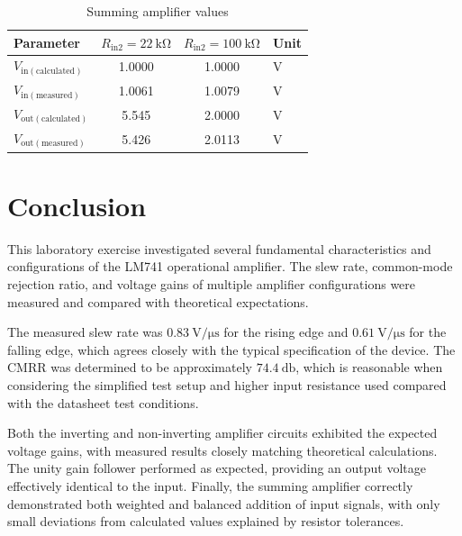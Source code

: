 \documentclass[conference]{IEEEtran}
\newcommand{\Rx}[1]{R_\mathrm{#1}}
\newcommand{\Vx}[1]{V_\mathrm{#1}}
\begin{document}
\begin{table}[!t]
    \centering
    \caption{Summing amplifier values}
    \label{tab:Sum}
    \begin{tabular}{l S[table-format=3.4] S[table-format=3.4] l}
        \toprule
        Parameter & {\(\Rx{in2} = \qty{22}{\kilo\ohm}\)} & {\(\Rx{in2} = \qty{100}{\kilo\ohm}\)} & Unit \\
        \midrule
        \(\Vx{in(calculated)}\)     & 1.0000  & 1.0000       & \(\unit{\volt}\) \\
        \(\Vx{in(measured)}\)       & 1.0061  & 1.0079       & \(\unit{\volt}\) \\
        \(\Vx{out(calculated)}\)    & 5.545   & 2.0000       & \(\unit{\volt}\) \\
        \(\Vx{out(measured)}\)      & 5.426   & 2.0113       & \(\unit{\volt}\) \\
        \bottomrule
    \end{tabular}
\end{table}


\section{Conclusion}

This laboratory exercise investigated several fundamental characteristics and configurations of the LM741 operational amplifier.  
The slew rate, common-mode rejection ratio, and voltage gains of multiple amplifier configurations were measured and compared with theoretical expectations.  

The measured slew rate was \(\qty{0.83}{\volt\per\micro\second}\) for the rising edge and \(\qty{0.61}{\volt\per\micro\second}\) for the falling edge, which agrees closely with the typical specification of the device.  
The CMRR was determined to be approximately \(\qty{74.4}{\decibel}\), which is reasonable when considering the simplified test setup and higher input resistance used compared with the datasheet test conditions.  

\newpage

Both the inverting and non-inverting amplifier circuits exhibited the expected voltage gains, with measured results closely matching theoretical calculations.  
The unity gain follower performed as expected, providing an output voltage effectively identical to the input.  
Finally, the summing amplifier correctly demonstrated both weighted and balanced addition of input signals, with only small deviations from calculated values explained by resistor tolerances.  
\end{document}
